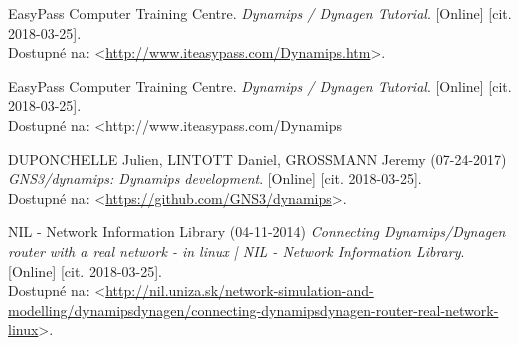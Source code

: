 \begin{thebibliography}{99}
\label{literatura}

EasyPass Computer Training Centre. {\it Dynamips / Dynagen Tutorial}. [Online] [cit. 2018-03-25]. \\ 
Dostupné na: <\url{http://www.iteasypass.com/Dynamips.htm}>.

EasyPass Computer Training Centre. {\it Dynamips / Dynagen Tutorial}. [Online] [cit. 2018-03-25]. \\ 
Dostupné na: <http://www.iteasypass.com/Dynamips%

DUPONCHELLE Julien, LINTOTT Daniel, GROSSMANN Jeremy (07-24-2017) {\it GNS3/dynamips: Dynamips development}. [Online] [cit. 2018-03-25]. \\ 
Dostupné na: <\url{https://github.com/GNS3/dynamips}>.

NIL - Network Information Library (04-11-2014) {\it Connecting Dynamips/Dynagen router with a real network - in linux | NIL - Network Information Library}. [Online] [cit. 2018-03-25]. \\ 
Dostupné na: <\url{http://nil.uniza.sk/network-simulation-and-modelling/dynamipsdynagen/connecting-dynamipsdynagen-router-real-network-linux}>.

\end{thebibliography}

